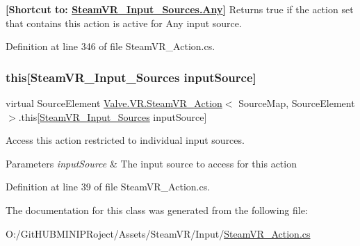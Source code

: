 {\bfseries{\mbox{[}Shortcut to\+: \mbox{\hyperlink{namespace_valve_1_1_v_r_a82e5bf501cc3aa155444ee3f0662853faed36a1ef76a59ee3f15180e0441188ad}{Steam\+V\+R\+\_\+\+Input\+\_\+\+Sources.\+Any}}\mbox{]}}} Returns true if the action set that contains this action is active for Any input source. 



Definition at line 346 of file Steam\+V\+R\+\_\+\+Action.\+cs.

\mbox{\label{class_valve_1_1_v_r_1_1_steam_v_r___action_abdb54a9331f280213d28abe5ef78ec07}} 
\subsubsection{\texorpdfstring{this[SteamVR\_Input\_Sources inputSource]}{this[SteamVR\_Input\_Sources inputSource]}}
{\footnotesize\ttfamily virtual Source\+Element \mbox{\hyperlink{class_valve_1_1_v_r_1_1_steam_v_r___action}{Valve.\+V\+R.\+Steam\+V\+R\+\_\+\+Action}}$<$ Source\+Map, Source\+Element $>$.this\mbox{[}\mbox{\hyperlink{namespace_valve_1_1_v_r_a82e5bf501cc3aa155444ee3f0662853f}{Steam\+V\+R\+\_\+\+Input\+\_\+\+Sources}} input\+Source\mbox{]}\hspace{0.3cm}{\ttfamily [get]}}



Access this action restricted to individual input sources. 


\begin{DoxyParams}{Parameters}
{\em input\+Source} & The input source to access for this action\\
\hline
\end{DoxyParams}


Definition at line 39 of file Steam\+V\+R\+\_\+\+Action.\+cs.



The documentation for this class was generated from the following file\+:\begin{DoxyCompactItemize}
\item 
O\+:/\+Git\+H\+U\+B\+M\+I\+N\+I\+P\+Roject/\+Assets/\+Steam\+V\+R/\+Input/\mbox{\hyperlink{_steam_v_r___action_8cs}{Steam\+V\+R\+\_\+\+Action.\+cs}}\end{DoxyCompactItemize}
